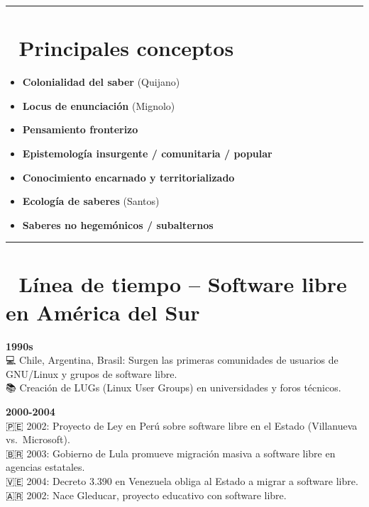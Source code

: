 \documentclass[
  letterpaper,
  DIV=11,
  numbers=noendperiod]{scrreprt}
\providecommand{\tightlist}{%
  \setlength{\itemsep}{0pt}\setlength{\parskip}{0pt}}
\begin{document}
\begin{center}\rule{0.5\linewidth}{0.5pt}\end{center}

\section{📌 Principales conceptos}\label{principales-conceptos}

\begin{itemize}
\tightlist
\item
  \textbf{Colonialidad del saber} (Quijano)
\item
  \textbf{Locus de enunciación} (Mignolo)
\item
  \textbf{Pensamiento fronterizo}
\item
  \textbf{Epistemología insurgente / comunitaria / popular}
\item
  \textbf{Conocimiento encarnado y territorializado}
\item
  \textbf{Ecología de saberes} (Santos)
\item
  \textbf{Saberes no hegemónicos / subalternos}
\end{itemize}

\begin{center}\rule{0.5\linewidth}{0.5pt}\end{center}

\section{📅 Línea de tiempo -- Software libre en América del
Sur}\label{luxednea-de-tiempo-software-libre-en-amuxe9rica-del-sur}

\textbf{1990s}\\
💻 Chile, Argentina, Brasil: Surgen las primeras comunidades de usuarios
de GNU/Linux y grupos de software libre.\\
📚 Creación de LUGs (Linux User Groups) en universidades y foros
técnicos.

\textbf{2000-2004}\\
🇵🇪 2002: Proyecto de Ley en Perú sobre software libre en el Estado
(Villanueva vs.~Microsoft).\\
🇧🇷 2003: Gobierno de Lula promueve migración masiva a software libre en
agencias estatales.\\
🇻🇪 2004: Decreto 3.390 en Venezuela obliga al Estado a migrar a software
libre.\\
🇦🇷 2002: Nace Gleducar, proyecto educativo con software libre.
\end{document}
